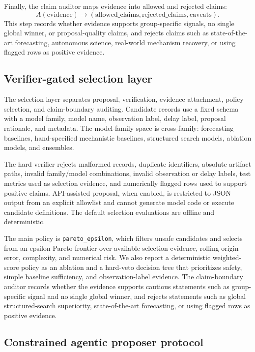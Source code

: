 Finally, the claim auditor maps evidence into allowed and rejected claims:
\[
A(\mathrm{evidence}) \rightarrow
(\mathrm{allowed\_claims}, \mathrm{rejected\_claims}, \mathrm{caveats}).
\]
This step records whether evidence supports group-specific signals, no single
global winner, or proposal-quality claims, and rejects claims such as
state-of-the-art forecasting, autonomous science, real-world mechanism
recovery, or using flagged rows as positive evidence.

\subsection{Verifier-gated selection layer}

The selection layer separates proposal, verification, evidence attachment,
policy selection, and claim-boundary auditing. Candidate records use a fixed
schema with a model family, model name, observation label, delay label,
proposal rationale, and metadata. The model-family space is cross-family:
forecasting baselines, hand-specified mechanistic baselines, structured search
models, ablation models, and ensembles.

The hard verifier rejects malformed records, duplicate identifiers, absolute
artifact paths, invalid family/model combinations, invalid observation or
delay labels, test metrics used as selection evidence, and numerically flagged
rows used to support positive claims. API-assisted proposal, when enabled, is
restricted to JSON output from an explicit allowlist and cannot generate model
code or execute candidate definitions. The default selection evaluations are
offline and deterministic.

The main policy is \texttt{pareto\_epsilon}, which filters unsafe candidates
and selects from an epsilon Pareto frontier over available selection evidence,
rolling-origin error, complexity, and numerical risk. We also report a
deterministic weighted-score policy as an ablation and a hard-veto decision
tree that prioritizes safety, simple baseline sufficiency, and
observation-label evidence. The claim-boundary auditor records whether the
evidence supports cautious statements such as group-specific signal and no
single global winner, and rejects statements such as global structured-search
superiority, state-of-the-art forecasting, or using flagged rows as positive
evidence.

\subsection{Constrained agentic proposer protocol}

